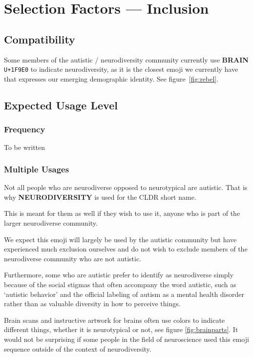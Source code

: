 \section{Selection Factors --- Inclusion}

\subsection{Compatibility}
Some members of the autistic / neurodiversity community currently use \textbf{BRAIN} \texttt{U+1F9E0}
to indicate neurodiversity, as it is the closest emoji we currently have that expresses our
emerging demographic identity. See figure~\ref{fig:rebel}.

\subsection{Expected Usage Level}

\subsubsection{Frequency}

To be written

\subsubsection{Multiple Usages}

Not all people who are neurodiverse opposed to neurotypical are autistic. That is why
\textbf{NEURODIVERSITY} is used for the CLDR short name.

This is meant for them as well if they wish to use it, anyone who is part of the larger
neurodiverse community.

We expect this emoji will largely be used by the autistic community but have experienced
much exclusion ourselves and do not wish to exclude members of the neurodiverse community
who are not autistic.

Furthermore, some who are autistic prefer to identify as neurodiverse simply because of
the social stigmas that often accompany the word autistic, such as `autistic behavior' and
the official labeling of autism as a mental health disorder rather than as valuable diversity
in how to perceive things.

Brain scans and instructive artwork for brains often use colors to indicate different things,
whether it is neurotypical or not, see figure \ref{fig:brainparts}. It would not be surprising
if some people in the field of neuroscience used this emoji sequence outside of the context
of neurodiversity.

